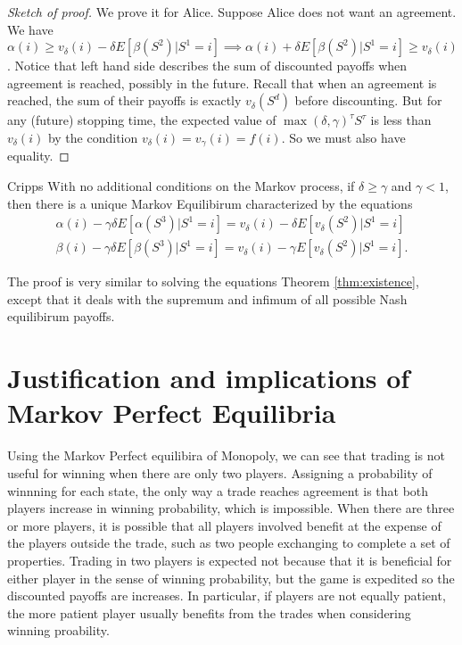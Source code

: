 \begin{proof}[Sketch of proof]
    We prove it for Alice. Suppose Alice does not want an agreement. We have $\alpha(i)\geq v_\delta(i) -\delta E[\beta(S^{2})|S^1=i]\implies \alpha(i)+\delta E[\beta(S^{2})|S^1=i]\geq v_\delta(i) $. Notice that left hand side describes the sum of discounted payoffs when agreement is reached, possibly in the future. Recall that when an agreement is reached, the sum of their payoffs is exactly $v_\delta(S^d)$ before discounting. But for any (future) stopping time, the expected value of $\max(\delta,\gamma)^{\tau} S^{\tau}$ is less than $v_\delta(i)$ by the condition  $v_\delta(i)=v_\gamma (i) = f(i)$. So we must also have equality.
\end{proof}
\begin{atheorem}{Cripps}{}
    With no additional conditions on the Markov process, if $\delta\geq \gamma$ and $\gamma<1$, then there is a unique Markov Equilibirum characterized by the equations \begin{align*}
        \alpha(i) - \gamma\delta E[\alpha(S^3)|S^1=i]=v_\delta(i)-\delta E[v_\delta(S^2)|S^1=i]\\
        \beta(i) - \gamma\delta E[\beta(S^3)|S^1=i]=v_\delta(i)-\gamma E[v_\delta(S^2)|S^1=i].
    \end{align*}
\end{atheorem}
The proof is very similar to solving the equations Theorem \ref{thm:existence}, except that it deals with the supremum and infimum of all possible Nash equilibirum payoffs.
\section{Justification and implications of Markov Perfect Equilibria}

Using the Markov Perfect equilibira of Monopoly, we can see that trading is not useful for winning when there are only two players. Assigning a probability of winnning
for each state, the only way a trade reaches agreement is that both players increase in winning probability, which is impossible. When there are three or more players, it is possible that all players involved benefit at the expense of the players outside the trade, such as two people exchanging to complete a set of properties. Trading in two players is expected not because that it is beneficial for either player in the sense of winning probability, but the game is expedited so the discounted payoffs are increases. In particular, if players are not equally patient, the more patient player usually benefits from the trades when considering winning proability.

